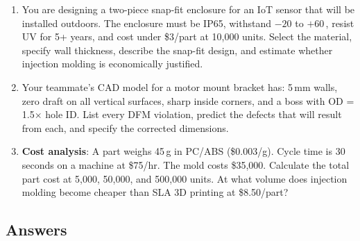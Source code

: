 \begin{enumerate}[resume,leftmargin=1.5em]
  \item You are designing a two-piece snap-fit enclosure for an IoT sensor that will be installed outdoors. The enclosure must be IP65, withstand $-20$ to $+60$\,\degC, resist UV for 5+ years, and cost under \$3/part at 10,000 units. Select the material, specify wall thickness, describe the snap-fit design, and estimate whether injection molding is economically justified.

  \item Your teammate's CAD model for a motor mount bracket has: 5\,mm walls, zero draft on all vertical surfaces, sharp inside corners, and a boss with OD = 1.5$\times$ hole ID. List every DFM violation, predict the defects that will result from each, and specify the corrected dimensions.

  \item \textbf{Cost analysis}: A part weighs 45\,g in PC/ABS (\$0.003/g). Cycle time is 30\,seconds on a machine at \$75/hr. The mold costs \$35,000. Calculate the total part cost at 5,000, 50,000, and 500,000 units. At what volume does injection molding become cheaper than SLA 3D printing at \$8.50/part?
\end{enumerate}

\subsection{Answers}

